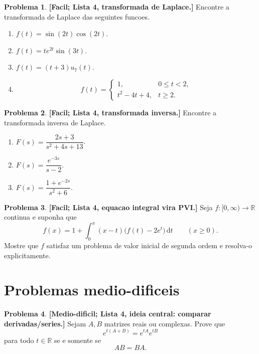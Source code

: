 \documentclass[10pt,a4paper]{amsart}
\newcommand{\R}{\mathbb{R}}
\renewcommand{\d}{\mathrm{d}}
\theoremstyle{definition}
\newtheorem{problema}{Problema}
\begin{document}
\begin{problema}
\textbf{[Facil; Lista 4, transformada de Laplace.]}
Encontre a transformada de Laplace das seguintes funcoes.
\begin{enumerate}[label=(\alph*)]
    \item $f(t)=\sin(2t)\cos(2t)$.
    \item $f(t)=t e^{2t}\sin(3t)$.
    \item $f(t)=(t+3)u_7(t)$.
    \item
    \[
        f(t)=
        \begin{cases}
        1, & 0\le t<2,\\
        t^2-4t+4, & t\ge 2.
        \end{cases}
    \]
\end{enumerate}
\end{problema}

\begin{problema}
\textbf{[Facil; Lista 4, transformada inversa.]}
Encontre a transformada inversa de Laplace.
\begin{enumerate}[label=(\alph*)]
    \item $F(s)=\dfrac{2s+3}{s^2+4s+13}$.
    \item $F(s)=\dfrac{e^{-3s}}{s-2}$.
    \item $F(s)=\dfrac{1+e^{-2s}}{s^2+6}$.
\end{enumerate}
\end{problema}

\begin{problema}
\textbf{[Facil; Lista 4, equacao integral vira PVI.]}
Seja $f:[0,\infty)\to\R$ continua e suponha que
\[
    f(x)=1+\int_0^x (x-t)\bigl(f(t)-2e^t\bigr)\,\d t
    \qquad(x\ge 0).
\]
Mostre que $f$ satisfaz um problema de valor inicial de segunda ordem e
resolva-o explicitamente.
\end{problema}

\section*{Problemas medio-dificeis}

\begin{problema}
\textbf{[Medio-dificil; Lista 4, ideia central: comparar derivadas/series.]}
Sejam $A,B$ matrizes reais ou complexas. Prove que
\[
    e^{t(A+B)}=e^{tA}e^{tB}
\]
para todo $t\in\R$ se e somente se
\[
    AB=BA.
\]
\end{problema}
\end{document}
